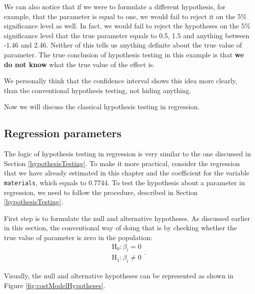 \documentclass[
]{book}
\theoremstyle{definition}
\theoremstyle{definition}
\theoremstyle{definition}
\theoremstyle{definition}
\theoremstyle{remark}
\begin{document}
We can also notice that if we were to formulate a different hypothesis, for example, that the parameter is equal to one, we would fail to reject it on the 5\% significance level as well. In fact, we would fail to reject the hypotheses on the 5\% significance level that the true parameter equals to 0.5, 1.5 and anything between -1.46 and 2.46. Neither of this tells us anything definite about the true value of parameter. The true conclusion of hypothesis testing in this example is that \textbf{we do not know} what the true value of the effect is.

We personally think that the confidence interval shows this idea more clearly, than the conventional hypothesis testing, not hiding anything.

Now we will discuss the classical hypothesis testing in regression.

\subsection{Regression parameters}\label{regression-parameters}

The logic of hypothesis testing in regression is very similar to the one discussed in Section \ref{hypothesisTesting}. To make it more practical, consider the regression that we have already estimated in this chapter and the coefficient for the variable \texttt{materials}, which equals to 0.7744. To test the hypothesis about a parameter in regression, we need to follow the procedure, described in Section \ref{hypothesisTesting}.

First step is to formulate the null and alternative hypotheses. As discussed earlier in this section, the conventional way of doing that is by checking whether the true value of parameter is zero in the population:
\begin{equation*}
\begin{aligned}
\mathrm{H}_0: \beta_i = 0 \\
\mathrm{H}_1: \beta_i \neq 0
\end{aligned} .
\end{equation*}

Visually, the null and alternative hypotheses can be represented as shown in Figure \ref{fig:costModelHypotheses}.
\end{document}
